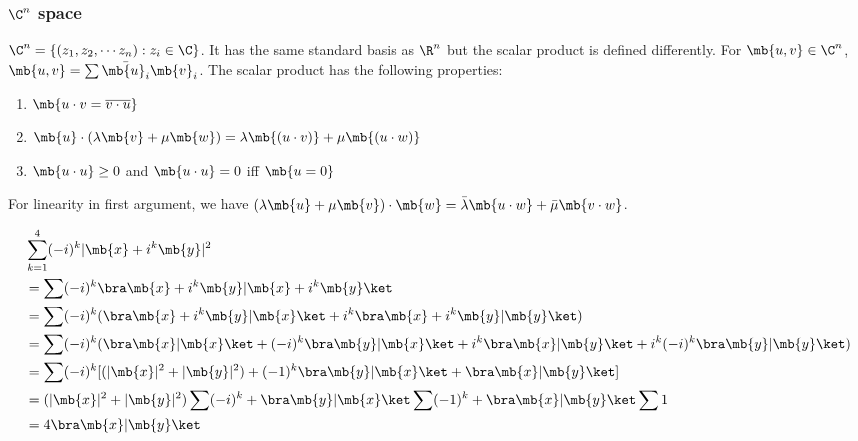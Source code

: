\documentclass[a4paper]{article}
\begin{document}
\subsubsection{\texorpdfstring{$\C^n$}{Cn} space}
\begin{defi}[$\C^n$]
  $\C^n = \{(z_1, z_2, \cdots z_n): z_i\in\C\}$. It has the same standard basis as $\R^n$ but the scalar product is defined differently. For $\mb{u, v}\in \C^n$, $\mb{u, v} = \sum \bar{\mb{u}_i}\mb{v}_i$. The scalar product has the following properties:
  \begin{enumerate}
  \item $\mb{u\cdot v = \overline{v\cdot u}}$
  \item $\mb{u}\cdot(\lambda\mb{v}+\mu\mb{w}) = \lambda\mb{(u\cdot v)} + \mu\mb{(u\cdot w)}$
  \item $\mb{u\cdot u} \geq 0$ and $\mb{u\cdot u} = 0$ iff $\mb{u = 0}$
  \end{enumerate}
\end{defi}
\note For linearity in first argument, we have $(\lambda\mb{u} + \mu\mb{v})\cdot\mb{w} = \bar{\lambda}\mb{u\cdot w} + \bar \mu\mb{v\cdot w}$.

\begin{eg}
  \begin{align*}
    &\sum_{k = 1}^4 (-i)^k|\mb{x} + i^k\mb{y}|^2\\
    &= \sum(-i)^k\bra\mb{x} + i^k \mb{y}|\mb{x} + i^k\mb{y}\ket\\
    &= \sum(-i)^k (\bra\mb{x} + i^k\mb{y}|\mb{x}\ket + i^k\bra\mb{x} + i^k\mb{y} | \mb{y}\ket)\\
    &= \sum(-i)^k (\bra\mb{x}|\mb{x}\ket + (-i)^k\bra\mb{y}|\mb{x}\ket + i^k\bra\mb{x}|\mb{y}\ket + i^k(-i)^k\bra\mb{y}|\mb{y}\ket)\\
    &= \sum(-i)^k [(|\mb{x}|^2 + |\mb{y}|^2) + (-1)^k\bra\mb{y}|\mb{x}\ket + \bra\mb{x}|\mb{y}\ket]\\
    &= (|\mb{x}|^2 + |\mb{y}|^2)\sum(-i)^k + \bra\mb{y}|\mb{x}\ket\sum(-1)^k + \bra\mb{x}|\mb{y}\ket\sum1\\
    &= 4\bra\mb{x}|\mb{y}\ket
  \end{align*}
\end{eg}
\end{document}
